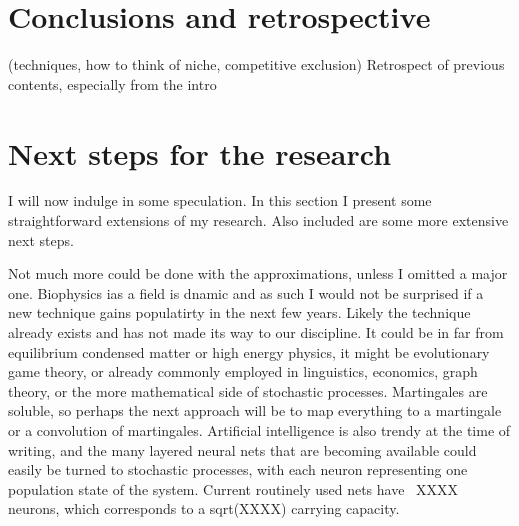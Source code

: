 \section{Conclusions and retrospective}
 (techniques, how to think of niche, competitive exclusion)
Retrospect of previous contents, especially from the intro


\section{Next steps for the research}
I will now indulge in some speculation. 
In this section I present some straightforward extensions of my research. 
Also included are some more extensive next steps. 

Not much more could be done with the approximations, unless I omitted a major one. 
Biophysics ias a field is dnamic and as such I would not be surprised if a new technique gains populatirty in the next few years. 
Likely the technique already exists and has not made its way to our discipline. 
It could be in far from equilibrium condensed matter or high energy physics, it might be evolutionary game theory, or already commonly employed in linguistics, economics, graph theory, or the more mathematical side of stochastic processes. 
Martingales are soluble, so perhaps the next approach will be to map everything to a martingale or a convolution of martingales. 
Artificial intelligence is also trendy at the time of writing, and the many layered neural nets that are becoming available could easily be turned to stochastic processes, with each neuron representing one population state of the system. 
Current routinely used nets have ~XXXX neurons, which corresponds to a sqrt(XXXX) carrying capacity. 

